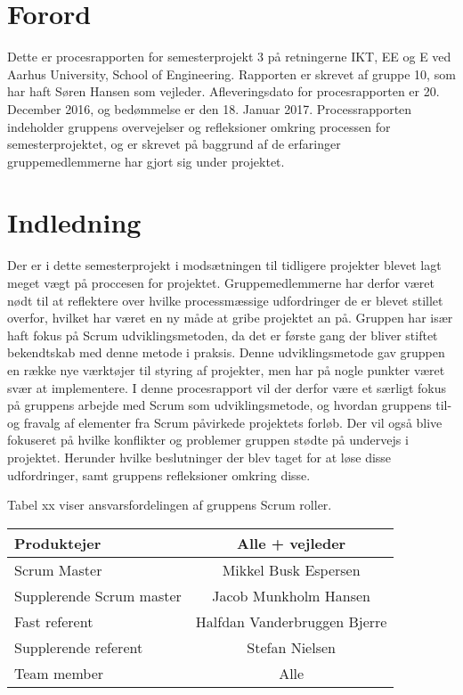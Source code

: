 \chapter{Forord}
Dette er procesrapporten for semesterprojekt 3 på retningerne IKT, EE og E ved Aarhus University, School of Engineering. Rapporten er skrevet af gruppe 10, som har haft Søren Hansen som vejleder. Afleveringsdato for procesrapporten er 20. December 2016, og bedømmelse er den 18. Januar 2017. Processrapporten indeholder gruppens overvejelser og refleksioner omkring processen for semesterprojektet, og er skrevet på baggrund af de erfaringer gruppemedlemmerne har gjort sig under projektet.    

\chapter{Indledning}
Der er i dette semesterprojekt i modsætningen til tidligere projekter blevet lagt meget vægt på proccesen for projektet. Gruppemedlemmerne har derfor været nødt til at reflektere over hvilke processmæssige udfordringer de er blevet stillet overfor, hvilket har været en ny måde at gribe projektet an på. Gruppen har især haft fokus på Scrum udviklingsmetoden, da det er første gang der bliver stiftet bekendtskab med denne metode i praksis. Denne udviklingsmetode gav gruppen en række nye værktøjer til styring af projekter, men har på nogle punkter været svær at implementere. I denne procesrapport vil der derfor være et særligt fokus på gruppens arbejde med Scrum som udviklingsmetode, og hvordan gruppens til- og fravalg af elementer fra Scrum påvirkede projektets forløb. Der vil også blive fokuseret på hvilke konflikter og problemer gruppen stødte på undervejs i projektet. Herunder hvilke beslutninger der blev taget for at løse disse udfordringer, samt gruppens refleksioner omkring disse.

Tabel xx viser ansvarsfordelingen af gruppens Scrum roller. \\

\begin{tabular}{| l | c |}
\hline
Produktejer & Alle + vejleder\\\hline
Scrum Master & Mikkel Busk Espersen\\\hline
Supplerende Scrum master & Jacob Munkholm Hansen\\\hline
Fast referent & Halfdan Vanderbruggen Bjerre\\\hline
Supplerende referent & Stefan Nielsen\\\hline
Team member & Alle\\\hline
\end{tabular}

